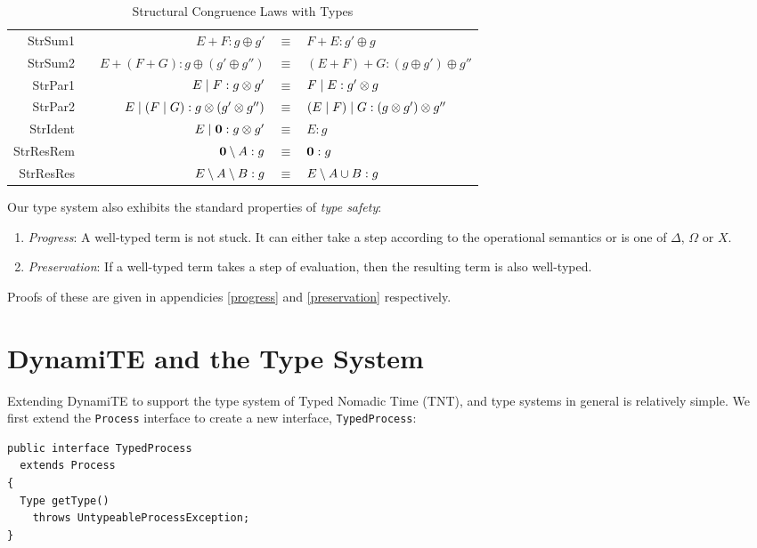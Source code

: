 \begin{table}
 \caption{Structural Congruence Laws with Types}
 \label{tab:typedstructcong}
  \shrule \centering
  \begin{tabular}{rcrcl}
  StrSum1 & \quad\quad &  
  $E + F : g \oplus g'$              & $\equiv$ & $F + E : g' \oplus g$
\\
  StrSum2 &&  
  $E + (F + G) : g \oplus (g' \oplus g'')$        & $\equiv$ & $(E + F) + G : (g \oplus g') \oplus g''$
\\
  StrPar1 &&  
  $E \;|\; F : g \otimes g'$            & $\equiv$ & $F \;|\; E : g' \otimes g$
\\
  StrPar2 &&  
  $E \;|\; (F \;|\; G) : g \otimes (g' \otimes g'')$    & $\equiv$ & $(E \;|\; F) \;|\; G : (g \otimes g') \otimes g''$
\\
  StrIdent &&  
  $E \;|\; \textbf{0} : g \otimes g'$         & $\equiv$ & $E : g$
\\
  StrResRem &&  
  $\textbf{0} \setminus {A} : g$       & $\equiv$ & $\textbf{0} : g$
\\
  StrResRes &&  
  $E \setminus {A} \setminus {B} : g$  & $\equiv$ & $E \setminus {A \cup B} : g$
  \end{tabular}
  \shrule
\end{table}

Our type system also exhibits the standard properties of \emph{type safety}:

\begin{enumerate}
\item \emph{Progress}: A well-typed term is not stuck.  It can either
  take a step according to the operational semantics or is one of
  $\Delta$, $\Omega$ or $X$.
\item \emph{Preservation}: If a well-typed term takes a step of
  evaluation, then the resulting term is also well-typed.
\end{enumerate}

\noindent Proofs of these are given in appendicies \ref{progress} and \ref{preservation} respectively.

\section{DynamiTE and the Type System}
\label{dyn:type}

Extending DynamiTE to support the type system of Typed Nomadic Time
(TNT), and type systems in general is relatively simple.  We first
extend the \texttt{Process} interface to create a new interface,
\texttt{TypedProcess}:

\begin{verbatim}
public interface TypedProcess
  extends Process
{
  Type getType()
    throws UntypeableProcessException;
}
\end{verbatim}

